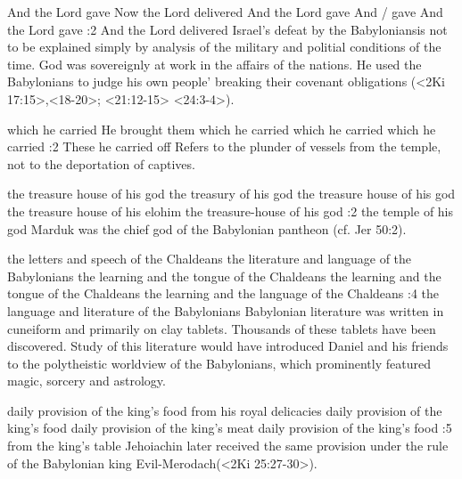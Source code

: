     {And the Lord gave} %
    {Now the Lord delivered} %
    {And the Lord gave} %
    {And \hebcosi/ gave} %
    {And the Lord gave} %
:2 {And the Lord delivered} Israel's defeat by the Babyloniansis 
not to be explained simply by analysis of the military and politial
conditions of the time. God was sovereignly at work in the affairs of 
the nations. He used the Babylonians to judge his own people' 
breaking their covenant obligations (<2Ki 17:15>,<18-20>; <21:12-15> 
<24:3-4>).

    {which he carried} %
    {He brought them} %
    {which he carried} %
    {which he carried} %
    {which he carried} %
:2 {These he carried off} Refers to the plunder of vessels 
from the temple, not to the deportation of captives. 

    {the treasure house of his god} %
    {the treasury of his god} %
    {the treasure house of his god} %
    {the treasure house of his elohim} %
    {the treasure-house of his god} %
:2 {the temple of his god} 
Marduk was the chief god of the Babylonian pantheon (cf. Jer 50:2).

    {the letters and speech of the Chaldeans} %
    {the literature and language of the Babylonians} %
    {the learning and the tongue of the Chaldeans} %
    {the learning and the tongue of the Chaldeans} %
    {the learning and the language of the Chaldeans} %
:4 {the language and literature of the Babylonians} Babylonian literature was written in
cuneiform and primarily on clay tablets. Thousands of these tablets have been discovered. Study of 
this literature would have introduced Daniel and his friends to the 
polytheistic worldview of the Babylonians, which prominently featured magic, sorcery and astrology. 


    {daily provision of the king's food} %
    {from his royal delicacies} %
    {daily provision of the king's food} %
    {daily provision of the king's meat} %
    {daily provision of the king's food} %
:5 {from the king's table} Jehoiachin later received the same 
provision under the rule of the Babylonian king Evil-Merodach(<2Ki 25:27-30>).

